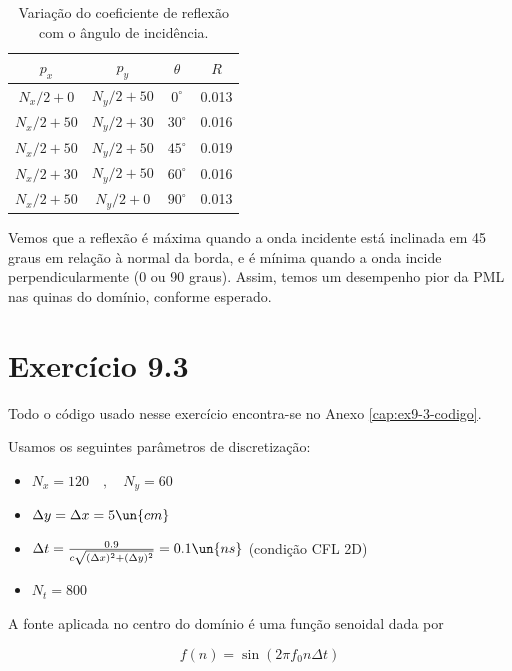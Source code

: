 \begin{table}[h!]
	\caption{Variação do coeficiente de reflexão com o ângulo de incidência.}
	\vspace{0.5cm}
	\centering
		\begin{tabular}{c|c|c|c}

		$p_x$ & $p_y$ & $\theta$ & $R$ \\ \hline
		$N_x / 2 + 0$    & $N_y / 2 + 50$       & $0 ^\circ$       &    0.013      \\ \hline
		$N_x / 2 + 50$    & $N_y / 2 + 30$       & $30 ^\circ$       &    0.016      \\ \hline
		$N_x / 2 + 50$    & $N_y / 2 + 50$       & $45 ^\circ$       &    0.019      \\ \hline
		$N_x / 2 + 30$    & $N_y / 2 + 50$       & $60 ^\circ$       &    0.016      \\ \hline
		$N_x / 2 + 50$    & $N_y / 2 + 0$       & $90 ^\circ$       &    0.013      \\
		\end{tabular}
	\label{tab:reflexao-angulo}
\end{table}

Vemos que a reflexão é máxima quando a onda incidente 
está inclinada em 45 graus em relação à normal da borda, 
e é mínima quando a onda incide perpendicularmente 
(0 ou 90 graus). Assim, temos um desempenho pior da PML nas quinas do domínio, 
conforme esperado.

\chapter{Exercício 9.3}

Todo o código usado nesse exercício encontra-se no Anexo \ref{cap:ex9-3-codigo}.

Usamos os seguintes parâmetros de discretização:

\begin{itemize}
	\item $N_x = 120 \quad , \quad N_y = 60$
	\item $\Delta y = \Delta x = 5 \un{cm}$
	\item $\Delta t = \frac{0.9}{c \sqrt{(\Delta x)^{2} + (\Delta y)^{2}}} = 0.1 \un{ns} $ (condição CFL 2D)
	\item $N_t = 800$
\end{itemize}

A fonte aplicada no centro do domínio é uma função senoidal dada por 

\[ f(n) = \sin \left( 2\pi f_0 n \Delta t \right) \]

